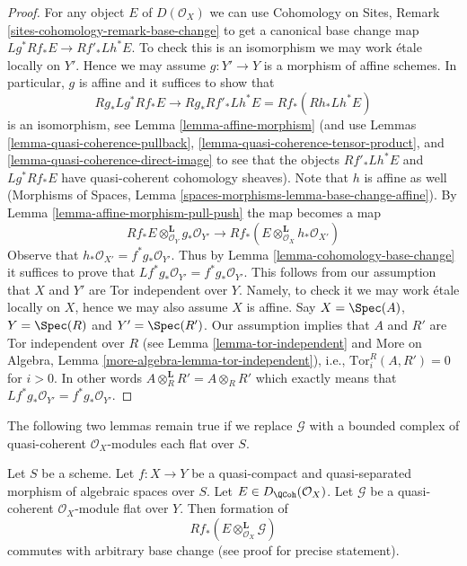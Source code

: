 \begin{proof}
For any object $E$ of $D(\mathcal{O}_X)$ we can use
Cohomology on Sites, Remark \ref{sites-cohomology-remark-base-change}
to get a canonical base change map $Lg^*Rf_*E \to Rf'_*Lh^*E$. To check this
is an isomorphism we may work \'etale locally on $Y'$. Hence we may assume
$g : Y' \to Y$ is a morphism of affine schemes. In particular, $g$
is affine and it suffices to show that
$$
Rg_*Lg^*Rf_*E \to Rg_*Rf'_*Lh^*E = Rf_*(Rh_* Lh^* E)
$$
is an isomorphism, see Lemma \ref{lemma-affine-morphism}
(and use Lemmas \ref{lemma-quasi-coherence-pullback},
\ref{lemma-quasi-coherence-tensor-product}, and
\ref{lemma-quasi-coherence-direct-image}
to see that the objects $Rf'_*Lh^*E$ and $Lg^*Rf_*E$
have quasi-coherent cohomology sheaves). Note that $h$ is
affine as well (Morphisms of Spaces, Lemma
\ref{spaces-morphisms-lemma-base-change-affine}).
By Lemma \ref{lemma-affine-morphism-pull-push} the map becomes a map
$$
Rf_*E \otimes_{\mathcal{O}_Y}^\mathbf{L} g_*\mathcal{O}_{Y'}
\longrightarrow
Rf_*(E \otimes_{\mathcal{O}_X}^\mathbf{L} h_*\mathcal{O}_{X'})
$$
Observe that $h_*\mathcal{O}_{X'} = f^*g_*\mathcal{O}_{Y'}$. Thus by
Lemma \ref{lemma-cohomology-base-change} it suffices to prove that
$Lf^*g_*\mathcal{O}_{Y'} = f^*g_*\mathcal{O}_{Y'}$. This follows from our
assumption that $X$ and $Y'$ are Tor independent over $Y$. Namely, to
check it we may work \'etale locally on $X$, hence we may also assume $X$
is affine. Say $X = \Spec(A)$, $Y = \Spec(R)$ and $Y' = \Spec(R')$.
Our assumption implies that $A$ and $R'$ are Tor independent over $R$
(see
Lemma \ref{lemma-tor-independent}
and
More on Algebra, Lemma \ref{more-algebra-lemma-tor-independent}), i.e.,
$\text{Tor}_i^R(A, R') = 0$ for $i > 0$. In other words
$A \otimes_R^\mathbf{L} R' = A \otimes_R R'$ which exactly means
that $Lf^*g_*\mathcal{O}_{Y'} = f^*g_*\mathcal{O}_{Y'}$.
\end{proof}

\noindent
The following two lemmas remain true if we replace $\mathcal{G}$ with a
bounded complex of quasi-coherent $\mathcal{O}_X$-modules each flat over $S$.

\begin{lemma}
\label{lemma-base-change-tensor}
Let $S$ be a scheme. Let $f : X \to Y$ be a quasi-compact and
quasi-separated morphism of algebraic spaces over $S$.
Let $E \in D_\QCoh(\mathcal{O}_X)$.
Let $\mathcal{G}$ be a quasi-coherent $\mathcal{O}_X$-module
flat over $Y$. Then formation of
$$
Rf_*(E \otimes^\mathbf{L}_{\mathcal{O}_X} \mathcal{G})
$$
commutes with arbitrary base change (see proof for precise statement).
\end{lemma}

